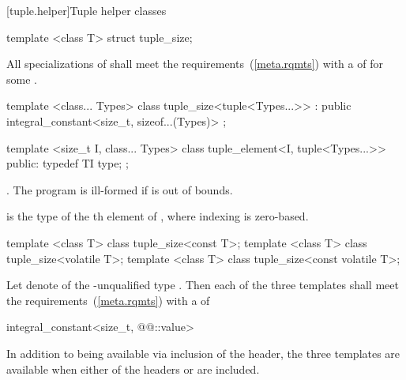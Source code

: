 [tuple.helper]{Tuple helper classes}

%
\begin{itemdecl}
template <class T> struct tuple_size;
\end{itemdecl}

\begin{itemdescr}
\pnum
\remarks All specializations of  shall meet the
 requirements~(\ref{meta.rqmts}) with a
 of 
for some .
\end{itemdescr}

%
\begin{itemdecl}
template <class... Types>
class tuple_size<tuple<Types...>>
  : public integral_constant<size_t, sizeof...(Types)> { };
\end{itemdecl}

%
\begin{itemdecl}
template <size_t I, class... Types>
class tuple_element<I, tuple<Types...>> {
public:
  typedef TI type;
};
\end{itemdecl}

\begin{itemdescr}
\pnum
\requires {}.
The program is ill-formed if  is out of bounds.

\pnum
\ctype {} is the
type of the th element of ,
where indexing is zero-based.
\end{itemdescr}

\begin{itemdecl}
template <class T> class tuple_size<const T>;
template <class T> class tuple_size<volatile T>;
template <class T> class tuple_size<const volatile T>;
\end{itemdecl}

\begin{itemdescr}
\pnum
Let  denote  of the \cv-unqualified type . Then each
of the three templates shall meet the  requirements~(\ref{meta.rqmts})
with a  of
\begin{codeblock}
integral_constant<size_t, @@::value>
\end{codeblock}

\pnum
In addition to being available via inclusion of the  header,
the three templates are available when either of the headers  or
 are included.
\end{itemdescr}

